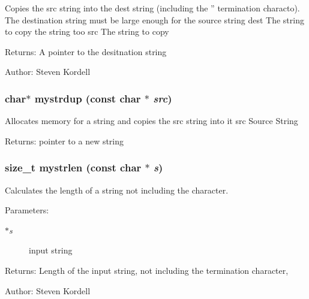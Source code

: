 Copies the src string into the dest string (including the '' termination characto). The destination string must be large enough for the source string  dest The string to copy the string too  src The string to copy \begin{Desc}
\item[Returns:]A pointer to the desitnation string \end{Desc}
\begin{Desc}
\item[Author:]Steven Kordell \end{Desc}
\subsubsection{\setlength{\rightskip}{0pt plus 5cm}char$\ast$ mystrdup (const char $\ast$ {\em src})}\label{mystring_8c_e4d69f24eeedc25d4a7abe09f6656cc2}


Allocates memory for a string and copies the src string into it  src Source String \begin{Desc}
\item[Returns:]pointer to a new string \end{Desc}
\subsubsection{\setlength{\rightskip}{0pt plus 5cm}size\_\-t mystrlen (const char $\ast$ {\em s})}\label{mystring_8c_f1b6719e84687596b7c8c4c9e146bc42}


Calculates the length of a string not including the  character. \begin{Desc}
\item[Parameters:]
\begin{description}
\item[{\em $\ast$s}]input string \end{description}
\end{Desc}
\begin{Desc}
\item[Returns:]Length of the input string, not including the termination character,  \end{Desc}
\begin{Desc}
\item[Author:]Steven Kordell \end{Desc}
